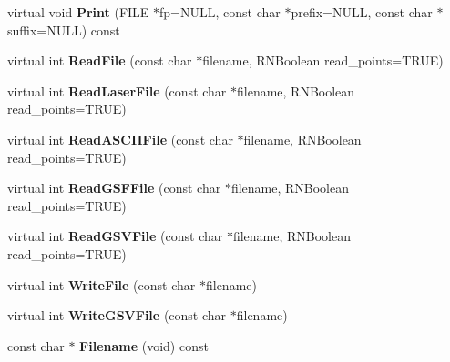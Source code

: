 \begin{DoxyCompactItemize}
\item 
virtual void {\bfseries Print} (F\+I\+LE $\ast$fp=N\+U\+LL, const char $\ast$prefix=N\+U\+LL, const char $\ast$suffix=N\+U\+LL) const \hypertarget{class_g_s_v_scene_af04a18bdc70a687c80c039b161d840f4}{}\label{class_g_s_v_scene_af04a18bdc70a687c80c039b161d840f4}

\item 
virtual int {\bfseries Read\+File} (const char $\ast$filename, R\+N\+Boolean read\+\_\+points=T\+R\+UE)\hypertarget{class_g_s_v_scene_a133b1a9690e219c691d41a5ce7494f99}{}\label{class_g_s_v_scene_a133b1a9690e219c691d41a5ce7494f99}

\item 
virtual int {\bfseries Read\+Laser\+File} (const char $\ast$filename, R\+N\+Boolean read\+\_\+points=T\+R\+UE)\hypertarget{class_g_s_v_scene_a95d03faffbd6ac4a0d7cc0acebbcaa32}{}\label{class_g_s_v_scene_a95d03faffbd6ac4a0d7cc0acebbcaa32}

\item 
virtual int {\bfseries Read\+A\+S\+C\+I\+I\+File} (const char $\ast$filename, R\+N\+Boolean read\+\_\+points=T\+R\+UE)\hypertarget{class_g_s_v_scene_a026a951e625ff3cc5216fe42c16c9218}{}\label{class_g_s_v_scene_a026a951e625ff3cc5216fe42c16c9218}

\item 
virtual int {\bfseries Read\+G\+S\+F\+File} (const char $\ast$filename, R\+N\+Boolean read\+\_\+points=T\+R\+UE)\hypertarget{class_g_s_v_scene_ad2b708547bcc6475d1fd5c18f002e021}{}\label{class_g_s_v_scene_ad2b708547bcc6475d1fd5c18f002e021}

\item 
virtual int {\bfseries Read\+G\+S\+V\+File} (const char $\ast$filename, R\+N\+Boolean read\+\_\+points=T\+R\+UE)\hypertarget{class_g_s_v_scene_ac2e717ea3d527a9b1757accea235a563}{}\label{class_g_s_v_scene_ac2e717ea3d527a9b1757accea235a563}

\item 
virtual int {\bfseries Write\+File} (const char $\ast$filename)\hypertarget{class_g_s_v_scene_a3c1a5e6a12ed3615d12e2156883b7819}{}\label{class_g_s_v_scene_a3c1a5e6a12ed3615d12e2156883b7819}

\item 
virtual int {\bfseries Write\+G\+S\+V\+File} (const char $\ast$filename)\hypertarget{class_g_s_v_scene_addda13a9212036680f37f2dcd57d93bd}{}\label{class_g_s_v_scene_addda13a9212036680f37f2dcd57d93bd}

\item 
const char $\ast$ {\bfseries Filename} (void) const \hypertarget{class_g_s_v_scene_a2507301263dd27ec498caedf1f5a3f4a}{}\label{class_g_s_v_scene_a2507301263dd27ec498caedf1f5a3f4a}


\end{DoxyCompactItemize}
